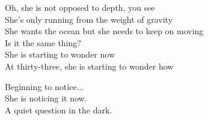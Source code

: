 \begin{lyrics}
Oh, she is not opposed to depth, you see\\
She's only running from the weight of gravity\\
She wants the ocean but she needs to keep on moving\\
Is it the same thing?\\ 
She is starting to wonder now\\
At thirty-three, she is starting to wonder how

Beginning to notice...\\
She is noticing it now.\\
A quiet question in the dark.
\end{lyrics}

